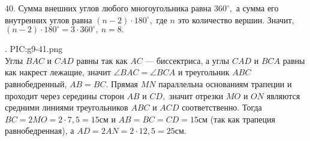 40. Сумма внешних углов любого многоугольника равна $360^\circ,$ а сумма его внутренних углов равна $(n-2)\cdot180^\circ,$ где $n$ это количество вершин. Значит, $(n-2)\cdot180^\circ=3\cdot360^\circ,\ n=8.$\newpage

. {{PIC:g9-41.png}}\\
Углы $BAC$ и $CAD$ равны так как $AC$ --- биссектриса, а углы $CAD$ и $BCA$ равны как накрест лежащие, значит $\angle BAC=\angle BCA$ и треугольник $ABC$ равнобедренный, $AB=BC.$ Прямая $MN$ параллельна основаниям трапеции и проходит через середины сторон $AB$ и $CD,$ значит отрезки $MO$ и $ON$ являются средними линиями треугольников $ABC$ и $ACD$ соответственно. Тогда $BC=2MO=2\cdot7,5=15$см и $AB=BC=CD=15$см (так как трапеция равнобедренная), а $AD=2AN=2\cdot12,5=25$см.\\
